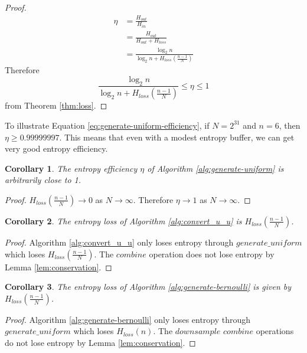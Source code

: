 \documentclass[12pt]{article}
\newtheorem{corollary}{Corollary}
\begin{document}
\begin{proof}
\begin{align}
    \eta & = \frac{H_{out}}{H_{in}} \\
         & = \frac{H_{out}}{H_{out}+H_{loss}} \\
         & = \frac{\log_2n}{\log_2n + H_{loss}(\frac{n-1}{N})}
\end{align}
Therefore 
\begin{equation}
\frac{\log_2n}{\log_2n + H_{loss}(\frac{n-1}{N})} \le \eta \le 1
\end{equation}
from Theorem \ref{thm:loss}.
\end{proof}

To illustrate Equation \ref{eq:generate-uniform-efficiency}, if $N=2^{31}$ and $n=6$, then $\eta \ge 0.99999997$. This means that even with a modest entropy buffer, we can get very good entropy efficiency.

\begin{corollary}
The entropy efficiency $\eta$ of Algorithm \ref{alg:generate-uniform} is arbitrarily close to 1.
\end{corollary}

\begin{proof}
$H_{loss}(\frac{n-1}{N}) \rightarrow 0$ as $N \rightarrow \infty$. Therefore $\eta \rightarrow 1$ as $N \rightarrow \infty$.
\end{proof}


\begin{corollary}
The entropy loss of Algorithm \ref{alg:convert_u_u} is $H_{loss}(\frac{n-1}{N})$.
\end{corollary}

\begin{proof}
    Algorithm \ref{alg:convert_u_u} only loses entropy through $generate\_uniform$ which loses $H_{loss}(\frac{n-1}{N})$. The $combine$ operation does not lose entropy by Lemma \ref{lem:conservation}.
\end{proof}

\begin{corollary}
The entropy loss of Algorithm \ref{alg:generate-bernoulli} is given by $H_{loss}(\frac{n-1}{N})$.
\end{corollary}

\begin{proof}
    Algorithm \ref{alg:generate-bernoulli} only loses entropy through $generate\_uniform$ which loses $H_{loss}(n)$. The $downsample$ $combine$ operations do not lose entropy by Lemma \ref{lem:conservation}.
\end{proof}
\end{document}
